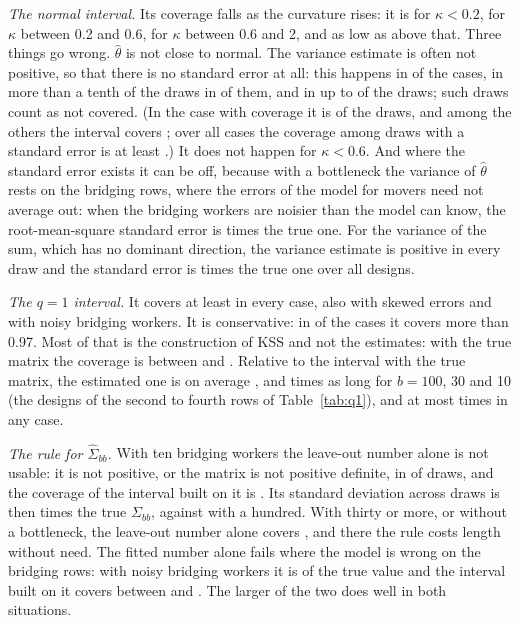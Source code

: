 \emph{The normal interval.} Its coverage falls as the curvature rises: it is  for
$\kappa<0.2$,  for $\kappa$ between 0.2 and 0.6,  for $\kappa$
between 0.6 and 2, and as low as  above that. Three things go wrong. $\hat\theta$ is not close to normal.
The variance estimate is often not positive, so that there is no standard error at all: this happens in
 of the  cases, in more than a tenth of the draws in  of them, and in
up to  of the draws; such draws count as not covered. (In the case with coverage
 it is  of the draws, and among the others the interval covers
; over all cases the coverage among draws with a standard error is at least
.) It does not happen for $\kappa<0.6$. And where the standard error exists it can be off,
because with a bottleneck the variance of $\hat\theta$ rests on the bridging rows, where the errors of the model
for movers need not average out: when the bridging workers are noisier than the model can know, the
root-mean-square standard error is  times the true one. For the variance of the sum, which has
no dominant direction, the variance estimate is positive in every draw and the standard error is 
times the true one over all designs.

\emph{The $q=1$ interval.} It covers at least  in every case, also with skewed errors and with
noisy bridging workers. It is conservative: in  of the  cases it covers more than
0.97. Most of that is the construction of KSS and not the estimates: with the true matrix the coverage is
between  and . Relative to the interval with the true matrix, the estimated
one is on average ,  and  times as long for
$b=100$, 30 and 10 (the designs of the second to fourth rows of Table~\ref{tab:q1}), and at most
 times in any case.

\emph{The rule for $\hat\Sigma_{bb}$.} With ten bridging workers the leave-out number alone is not usable: it is
not positive, or the matrix is not positive definite, in  of draws, and the coverage of the
interval built on it is . Its standard deviation across draws is then  times
the true $\Sigma_{bb}$, against  with a hundred. With thirty or more, or without a bottleneck, the
leave-out number alone covers , and there the rule costs length without need. The fitted number
alone fails where the model is wrong on the bridging rows: with noisy bridging workers it is
 of the true value and the interval built on it covers between  and
. The larger of the two does well in both situations.

